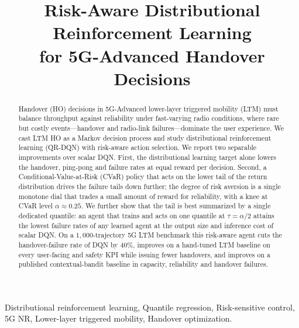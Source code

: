 \documentclass[conference]{IEEEtran}
\begin{document}
\title{Risk-Aware Distributional Reinforcement Learning\\for 5G-Advanced Handover Decisions}

\author{
}

\maketitle

\begin{abstract}
Handover (HO) decisions in 5G-Advanced lower-layer triggered mobility (LTM) must
balance throughput against reliability under fast-varying radio conditions, where
rare but costly events---handover and radio-link failures---dominate the user
experience. We cast LTM HO as a Markov decision process and study distributional
reinforcement learning (QR-DQN) with risk-aware action selection. We report two
separable improvements over scalar DQN. First, the distributional learning target
alone lowers the handover, ping-pong and failure rates at equal reward per
decision. Second, a Conditional-Value-at-Risk (CVaR) policy that acts on the lower
tail of the return distribution drives the failure tails down further; the degree
of risk aversion is a single monotone dial that trades a small amount of reward for
reliability, with a knee at CVaR level $\alpha\approx0.25$. We further show that the
tail is best summarized by a single dedicated quantile: an agent that trains and
acts on one quantile at $\tau=\alpha/2$ attains the lowest failure rates of any
learned agent at the output size and inference cost of scalar DQN. On a
$1{,}000$-trajectory 5G LTM benchmark this risk-aware agent cuts the
handover-failure rate of DQN by $40\%$, improves on a hand-tuned LTM
baseline on every user-facing and safety KPI
while issuing fewer handovers, and improves on a published contextual-bandit
baseline in capacity, reliability and handover failures.
\end{abstract}

\begin{IEEEkeywords}
Distributional reinforcement learning, Quantile regression, Risk-sensitive control, 5G NR, Lower-layer triggered mobility,
Handover optimization.
\end{IEEEkeywords}
\end{document}
